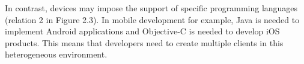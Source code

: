 In contrast, devices may impose the support of specific programming languages (relation 2 in Figure 2.3). In mobile development for example, Java is needed to implement Android applications and Objective-C is needed to develop iOS products. This means that developers need to create multiple clients in this heterogeneous environment. 



 










